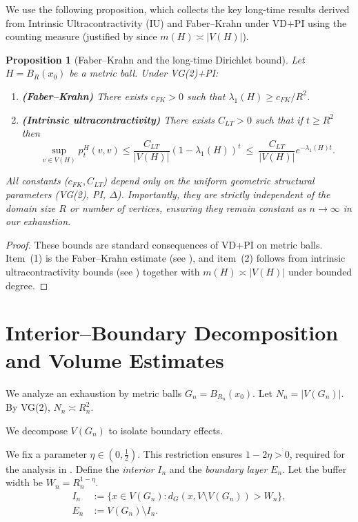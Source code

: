 \documentclass[reqno]{amsart}
\numberwithin{equation}{section}
\newtheorem{proposition}[proposition]{Proposition}
\theoremstyle{definition}
\theoremstyle{remark}
\begin{document}
We use the following proposition, which collects the key long-time results derived from Intrinsic Ultracontractivity (IU) and Faber--Krahn under VD+PI using the counting measure (justified by  since $m(H) \asymp |V(H)|$).

\begin{proposition}[Faber--Krahn and the long-time Dirichlet bound]\label{prop:LT}
Let $H=B_R(x_0)$ be a metric ball. Under VG(2)+PI:
\begin{enumerate}
    \item \textbf{(Faber--Krahn)} There exists $c_{FK}>0$ such that $\lambda_1(H)\ge c_{FK}/R^{2}$.
    \item \textbf{(Intrinsic ultracontractivity)} There exists $C_{LT}>0$ such that if $t\ge R^{2}$ then
    \begin{equation}\label{eq:IU}
        \sup_{v \in V(H)} p_t^H(v,v) \leq \frac{C_{LT}}{|V(H)|} (1-\lambda_1(H))^{t} \ \le\ \frac{C_{LT}}{|V(H)|} e^{-\lambda_1(H) t}.
    \end{equation}
\end{enumerate}
All constants ($c_{FK}, C_{LT}$) depend only on the uniform geometric structural parameters (\textup{VG(2), PI,} $\Delta$). Importantly, they are strictly independent of the domain size $R$ or number of vertices, ensuring they remain constant as $n \to \infty$ in our exhaustion.
\end{proposition}

\begin{proof}
These bounds are standard consequences of VD+PI on metric balls. Item~(1) is the Faber--Krahn estimate (see \cite{Grigoryan09, BarlowBass04}), and item~(2) follows from intrinsic ultracontractivity bounds (see \cite{BassKumagai08, Grigoryan09}) together with $m(H)\asymp |V(H)|$ under bounded degree.
\end{proof}

\section{Interior--Boundary Decomposition and Volume Estimates}\label{sec:decomposition}

We analyze an exhaustion by metric balls $G_n = B_{R_n}(x_0)$. Let $N_n = |V(G_n)|$. By VG(2), $N_n \asymp R_n^2$.

We decompose $V(G_n)$ to isolate boundary effects.

We fix a parameter $\eta \in (0, \tfrac{1}{2})$. This restriction ensures $1-2\eta>0$, required for the analysis in . Define the \emph{interior} $I_n$ and the \emph{boundary layer} $E_n$. Let the buffer width be $W_n = R_n^{1-\eta}$.
\begin{align*}
I_n &:= \{x \in V(G_n) : d_G(x, V \setminus V(G_n)) > W_n\}, \\
E_n &:= V(G_n) \setminus I_n.
\end{align*}
\end{document}
